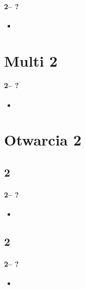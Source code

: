 \documentclass[12pt, a4paper]{report}
\begin{document}
{{        \subsubsection*{2\clubs -- ?}
        \begin{itemize}
            \item 
        \end{itemize}
    }

    \chapter*{\colorbox{Plum!30}{Multi 2\diams}}
     {
        \subsubsection*{2\diams -- ?}
        \begin{itemize}
            \item 
        \end{itemize}
    }

    \chapter*{\colorbox{Plum!30}{Otwarcia 2\major}}
     {

        \section*{\colorbox{blue!30}{2\hearts}}
         { 
            \subsubsection*{2\hearts -- ?}
            \begin{itemize}
                \item 
            \end{itemize}
        }

        \section*{\colorbox{blue!30}{2\spades}}
         { 
            \subsubsection*{2\spades -- ?}
            \begin{itemize}
                \item 
            \end{itemize}
        }
    }

}
\end{document}
